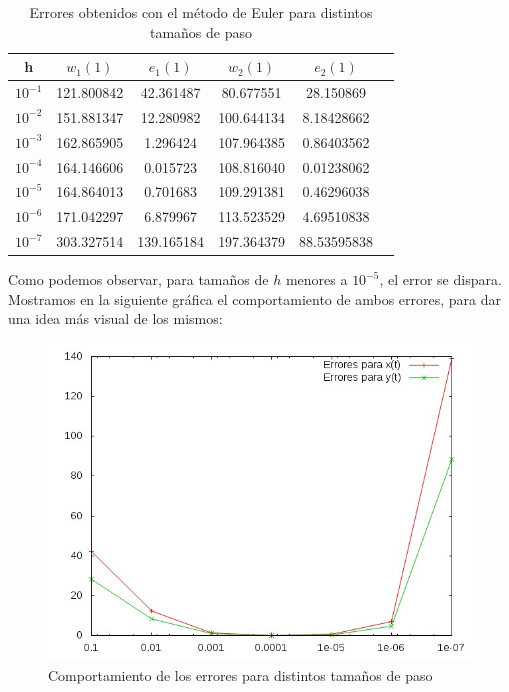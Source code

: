 \documentclass[12pt]{article}       %
\begin{document}
    \begin{table}[H]
        \centering
        \setlength\extrarowheight{2.5pt}
        
        \begin{tabular}{|c|c|c|c|c|c}
            \hline
            \textbf{h} & {\textbf{$w_1(1)$}} & \textbf{$e_1(1)$} & {\textbf{$w_2(1)$}} & \textbf{$e_2(1)$} \\ 
            \hline
                $10^{-1}$ & 121.800842 & 42.361487 & 80.677551 & 28.150869 \\
            \hline
                $10^{-2}$ & 151.881347 & 12.280982 & 100.644134 & 8.18428662 \\
            \hline 
                $10^{-3}$ & 162.865905 & 1.296424 & 107.964385 & 0.86403562 \\ 
            \hline
                $10^{-4}$ & 164.146606 & 0.015723 & 108.816040 & 0.01238062 \\
            \hline
                $10^{-5}$ & 164.864013 & 0.701683 & 109.291381 & 0.46296038 \\
            \hline
                $10^{-6}$ & 171.042297 & 6.879967 & 113.523529 & 4.69510838 \\
            \hline
                $10^{-7}$ & 303.327514 & 139.165184 & 197.364379 & 88.53595838 \\
            \hline 
        \end{tabular}
        
        \caption{Errores obtenidos con el método de Euler para distintos tamaños de paso}           
    \end{table}
    
Como podemos observar, para tamaños de $h$ menores a $10^{-5}$, el error se dispara. Mostramos en la siguiente gráfica el comportamiento de ambos errores, para dar una idea más visual de los mismos:

\begin{figure}
    \centering
    \includegraphics[scale=0.5]{img/graph_error_comb}
    \caption{Comportamiento de los errores para distintos tamaños de paso}
    \label{fig:graph_error_comb}
\end{figure}
\end{document}
